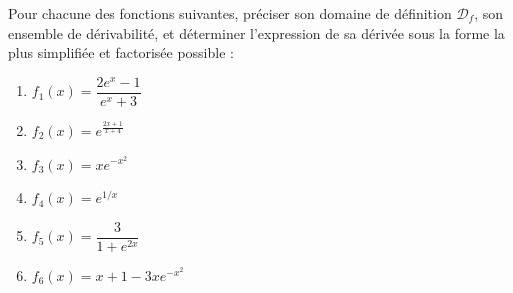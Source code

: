 \documentclass[11pt,a4paper]{article}
\begin{document}
Pour chacune des fonctions suivantes, préciser son domaine de définition $\mathcal{D}_f$, son ensemble de dérivabilité, et déterminer l'expression de sa dérivée sous la forme la plus simplifiée et factorisée possible :
\begin{enumerate}[label=\textbf{\arabic*.}]
    \item $f_1(x) = \dfrac{2e^x - 1}{e^x + 3}$
    \item $f_2(x) = e^{\frac{2x+1}{x+4}}$
    \item $f_3(x) = x e^{-x^2}$
    \item $f_4(x) = e^{1/x}$
    \item $f_5(x) = \dfrac{3}{1 + e^{2x}}$
    \item $f_6(x) = x + 1 - 3x e^{-x^2}$
\end{enumerate}
\end{document}
